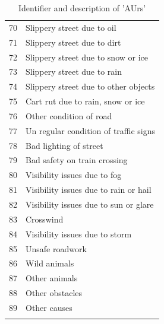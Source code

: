 \documentclass[a4paper,headsepline,footsepline,fontsize=11pt,BCOR=12mm,DIV=12]{report}
\begin{document}
	\begin{longtable}{c|l}  
	70 & Slippery street due to oil \\
	71 & Slippery street due to dirt \\
	72 & Slippery street due to snow or ice \\
	73 & Slippery street due to rain \\
	74 & Slippery street due to other objects \\
	75 & Cart rut due to rain, snow or ice \\
	76 & Other condition of road \\
	77 & Un regular condition of traffic signs \\
	78 & Bad lighting of street \\
	79 & Bad safety on train crossing \\
	80 & Visibility issues due to fog \\
	81 & Visibility issues due to rain or hail \\
	82 & Visibility issues due to sun or glare \\
	83 & Crosswind \\
	84 & Visibility issues due to storm \\
	85 & Unsafe roadwork \\
	86 & Wild animals \\
	87 & Other animals \\
	88 & Other obstacles \\
	89 & Other causes \\
	\caption{Identifier and description of 'AUrs'} \\
	\end{longtable}
	\label{table:baysis_dataset_AUrs}
\endgroup
\end{document}
